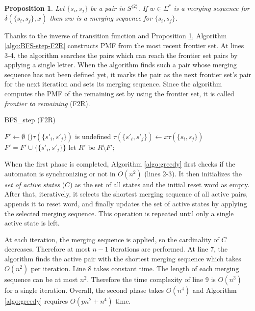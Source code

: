 \documentclass[12pt]{article}
\newtheorem{proposition}{Proposition}[section]
\begin{document}
\begin{proposition}
	\label{prop:merging}
	Let $\{ s_i,s_j \}$ be a pair in $S^{\langle 2 \rangle}$. If $w \in \Sigma^*$ is a merging sequence for $\delta(\{ s_i,s_j \}, x)$ then $xw$ is a merging sequence for $\{s_i,s_j \}$.
\end{proposition}

Thanks to the inverse of transition function and Proposition \ref{prop:merging}, Algorithm \ref{algo:BFS-step-F2R} constructs PMF from the most recent frontier set. At lines 3-4, the algorithm searches the pairs which can reach the frontier set pairs by applying a single letter. When the algorithm finds such a pair whose merging sequence has not been defined yet, it marks the pair as the next frontier set's pair for the next iteration and sets its merging sequence. Since the algorithm computes the PMF of the remaining set by using the frontier set, it is called \textit{frontier to remaining} (F2R). 

\begin{algorithm}[ht]
	\caption{{BFS\_step (F2R)}}
	\label{algo:BFS-step-F2R}
	
	
	$F' \longleftarrow \emptyset$\;
	{
		{
			{
				\If(){$\tau(\{ s'_i,s'_j\})$ is undefined}
				{
					$\tau(\{ s'_i,s'_j \}) \longleftarrow x \tau(\{ s_i,s_j \})$\;
					$F' = F' \cup \{ \{ s'_i,s'_j \}  \} $\;
				}
			}
		}
	}
	let $R'$ be $R \setminus F'$;
\end{algorithm}

When the first phase is completed, Algorithm \ref{algo:greedy} first checks if the automaton is synchronizing or not in $O(n^2)$ (lines 2-3). It then initializes the \textit{set of active states} ($C$) as the set of all states and the initial reset word as empty. After that, iteratively, it selects the shortest merging sequence of all active pairs, appends it to reset word, and finally updates the set of active states by applying the selected merging sequence. This operation is repeated until only a single active state is left. 

At each iteration, the merging sequence is applied, so the cardinality of $C$ decreases. Therefore at most $n-1$ iterations are performed. At line 7, the algorithm finds the active pair with the shortest merging sequence which takes $O(n^2)$ per iteration. Line 8 takes constant time. The length of each merging sequence can be at most $n^2$. Therefore the time complexity of line 9 is $O(n^3)$ for a single iteration. Overall, the second phase takes $O(n^4)$ and Algorithm \ref{algo:greedy} requires $O(pn^2 + n^4)$ time. 
\end{document}
